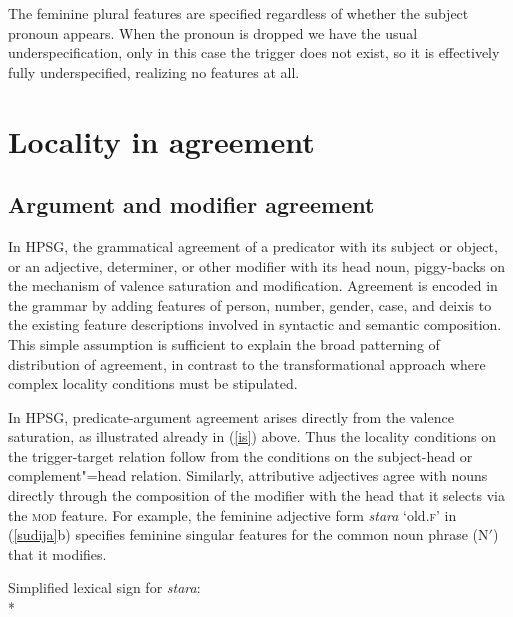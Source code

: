\documentclass[output=paper
	        ,collection
	        ,collectionchapter
 	        ,biblatex
                ,babelshorthands
                ,newtxmath
                ,draftmode
                ,colorlinks, citecolor=brown
]{langscibook}
\begin{document}
\noindent
The feminine plural features are specified regardless of whether  the subject pronoun appears.  When the pronoun is dropped we have the usual underspecification, only in this case the trigger does not exist, so it is effectively fully underspecified, realizing no features at all.  


\section{Locality in agreement} 

\subsection{Argument and modifier agreement}
\label{arg-mod-agr}

In HPSG, the grammatical agreement of a predicator with its subject or object, or an adjective, determiner, or other modifier with its head noun, piggy-backs on the mechanism of valence saturation and modification.   Agreement is encoded in the grammar by adding features of person, number, gender, case, and deixis to the existing feature descriptions involved in syntactic and semantic composition.  This simple assumption is sufficient to explain the broad patterning of distribution of agreement, in contrast to the transformational approach where complex locality conditions must be stipulated.   

In HPSG, predicate-argument agreement arises directly from the  valence saturation, as illustrated already in (\ref{is}) above.  Thus the locality conditions on the trigger-target relation follow from the conditions on the subject-head or complement"=head relation.   Similarly, attributive adjectives agree with nouns directly through the composition of the modifier with the head that it selects via the \textsc{mod} feature.  For example, the  feminine adjective form \textit{stara} `old.\textsc{f}' in (\ref{sudija}b) specifies feminine singular features for the common noun phrase (N$'$) that it modifies.  

\begin{exe} 
\ex	\label{stara}  Simplified lexical sign for  \textit{stara}:\\*
\end{exe}
\end{document}
